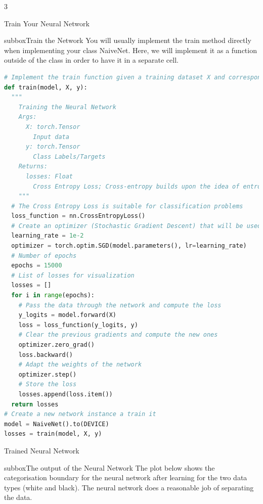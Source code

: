 \begin{multicols}{3}
\begin{textbox}{Train Your Neural Network}
\begin{subbox}{subbox}{Train the Network}
You will usually implement the train method directly when implementing your class NaiveNet. Here, we will implement it as a function outside of the class in order to have it in a separate cell. 
\begin{lstlisting}[language=Python]
# Implement the train function given a training dataset X and corresponding labels y
def train(model, X, y):
  """
    Training the Neural Network
    Args:
      X: torch.Tensor
        Input data
      y: torch.Tensor
        Class Labels/Targets
    Returns:
      losses: Float
        Cross Entropy Loss; Cross-entropy builds upon the idea of entropy from information theory and calculates the number of bits required to represent or transmit an average event from one distribution compared to another distribution.
    """
  # The Cross Entropy Loss is suitable for classification problems
  loss_function = nn.CrossEntropyLoss()
  # Create an optimizer (Stochastic Gradient Descent) that will be used to train the network
  learning_rate = 1e-2
  optimizer = torch.optim.SGD(model.parameters(), lr=learning_rate)
  # Number of epochs
  epochs = 15000
  # List of losses for visualization
  losses = []
  for i in range(epochs):
    # Pass the data through the network and compute the loss
    y_logits = model.forward(X)
    loss = loss_function(y_logits, y)
    # Clear the previous gradients and compute the new ones
    optimizer.zero_grad()
    loss.backward()
    # Adapt the weights of the network
    optimizer.step()
    # Store the loss
    losses.append(loss.item())
  return losses
# Create a new network instance a train it
model = NaiveNet().to(DEVICE)
losses = train(model, X, y)
\end{lstlisting}
\end{subbox}
\end{textbox}
\begin{textbox}{Trained Neural Network}
\begin{subbox}{subbox}{The output of the Neural Network}
\scriptsize
The plot below shows the categorisation boundary for the neural network after learning for the two data types (white and black). The neural network does a reasonable job of separating the data.
\begin{center}

\end{center}
\end{subbox}
\end{textbox}
\end{multicols}
